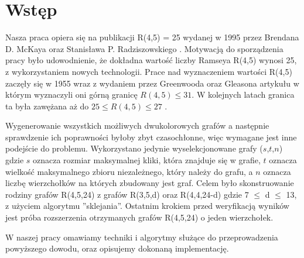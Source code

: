 \chapter{Wstęp}

Nasza praca opiera się na publikacji R(4,5) = 25 wydanej w 1995 przez Brendana D. McKaya oraz Stanisława P. Radziszowskiego  \cite{mainpaper}. Motywacją do sporządzenia pracy było udowodnienie, że dokładna wartość liczby Ramseya R(4,5) wynosi 25, z wykorzystaniem nowych technologii. Prace nad wyznaczeniem wartości R(4,5) zaczęły się w 1955 wraz z wydaniem przez Greenwooda oraz Gleasona\cite{gandg} artykułu w którym wyznaczyli oni górną granicę $R(4,5) \leq 31$. W kolejnych latach granica ta była zawężana aż do $25 \leq R(4,5) \leq 27$ \cite{jgbound, mrbound}.\par
Wygenerowanie wszystkich możliwych dwukolorowych grafów a następnie sprawdzenie ich poprawności byłoby zbyt czasochłonne, więc wymagane jest inne podejście do problemu. Wykorzystano jedynie wyselekcjonowane grafy ($s$,$t$,$n$) gdzie $s$ oznacza rozmiar maksymalnej kliki, która znajduje się w grafie, $t$ oznacza wielkość maksymalnego zbioru niezależnego, który należy do grafu, a $n$ oznacza liczbę wierzchołków na których zbudowany jest graf. Celem było skonstruowanie rodziny grafów R(4,5,24) z grafów R(3,5,d) oraz R(4,4,24-d) gdzie 7 $\leq$ d $\leq$ 13, z użyciem algorytmu ''sklejania''. Ostatnim krokiem przed weryfikacją wyników jest próba rozszerzenia otrzymanych grafów R(4,5,24) o jeden wierzchołek.

W naszej pracy omawiamy techniki i algorytmy służące do przeprowadzenia powyższego dowodu, oraz opisujemy dokonaną implementację.

